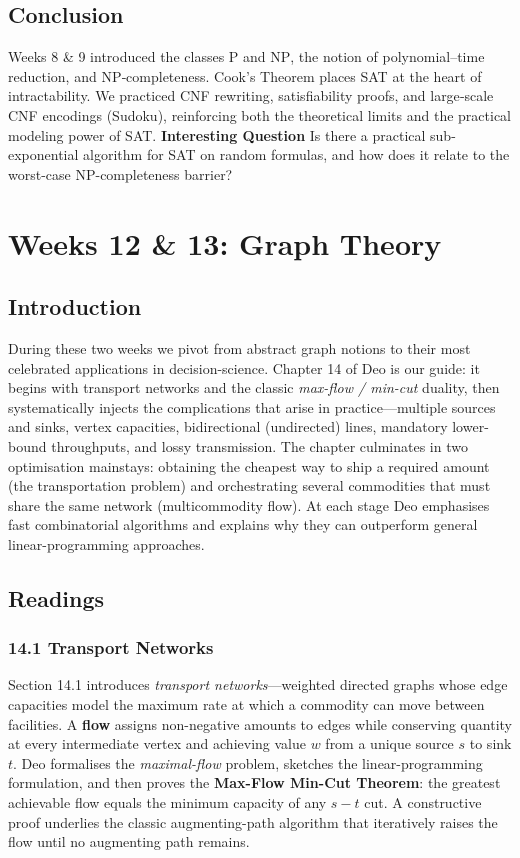 \documentclass{article}
\theoremstyle{theorem}
\theoremstyle{definition}
\theoremstyle{remark}
\begin{document}
\subsection{Conclusion}
Weeks 8 \& 9 introduced the classes \(\mathrm{P}\) and \(\mathrm{NP}\), the
notion of polynomial–time reduction, and NP‐completeness.  Cook’s Theorem
places SAT at the heart of intractability.  We practiced CNF rewriting,
satisfiability proofs, and large‐scale CNF encodings (Sudoku), reinforcing
both the theoretical limits and the practical modeling power of SAT.
\textbf{Interesting Question}
Is there a practical sub-exponential algorithm for SAT on random formulas,
and how does it relate to the worst-case NP-completeness barrier?

\section{Weeks 12 \& 13: Graph Theory}

\subsection{Introduction}
During these two weeks we pivot from abstract graph notions to their most celebrated applications in decision-science.  Chapter 14 of Deo is our guide: it begins with transport networks and the classic \emph{max-flow / min-cut} duality, then systematically injects the complications that arise in practice—multiple sources and sinks, vertex capacities, bidirectional (undirected) lines, mandatory lower-bound throughputs, and lossy transmission.  The chapter culminates in two optimisation mainstays: obtaining the cheapest way to ship a required amount (the transportation problem) and orchestrating several commodities that must share the same network (multicommodity flow).  At each stage Deo emphasises fast combinatorial algorithms and explains why they can outperform general linear-programming approaches. \cite{Deo}

\subsection{Readings}

\subsubsection*{\textbf{14.1} Transport Networks}
Section 14.1 introduces \emph{transport networks}—weighted directed graphs whose edge capacities model the maximum rate at which a commodity can move between facilities.  A \textbf{flow} assigns non-negative amounts to edges while conserving quantity at every intermediate vertex and achieving value \(w\) from a unique source \(s\) to sink \(t\).  Deo formalises the \emph{maximal-flow} problem, sketches the linear-programming formulation, and then proves the \textbf{Max-Flow Min-Cut Theorem}: the greatest achievable flow equals the minimum capacity of any \(s\!-\!t\) cut.  A constructive proof underlies the classic augmenting-path algorithm that iteratively raises the flow until no augmenting path remains. \cite{Deo}
\end{document}
